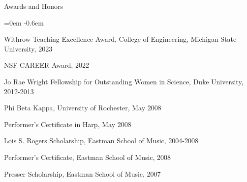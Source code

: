 \documentclass{resume} %
\begin{document}
\begin{rSection}{Awards and Honors}

\begin{list}{}{\leftmargin=0em}
   \itemsep -0.6em %
\item Withrow Teaching Excellence Award, College of Engineering, Michigan State University, 2023
\item NSF CAREER Award, 2022
\item
Jo Rae Wright Fellowship for Outstanding Women in Science, Duke University, 2012-2013
\item
Phi Beta Kappa, University of Rochester, May 2008


\item
Performer's Certificate in Harp, May 2008



\item
Lois S. Rogers Scholarship, Eastman School of Music, 2004-2008

\item Performer's Certificate, Eastman School of Music, 2008 
\item
Presser Scholarship, Eastman School of Music, 2007


\end{list}


\end{rSection}


\newpage
\end{document}
